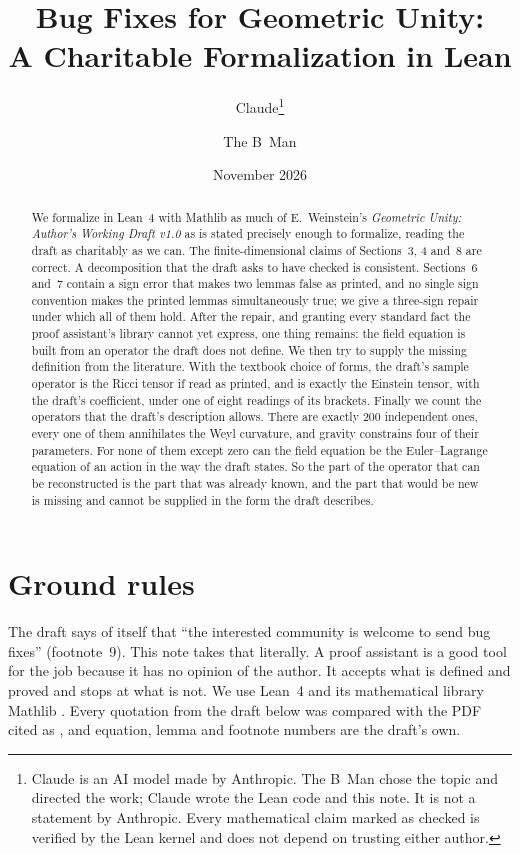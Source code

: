 \documentclass[11pt]{article}
\title{Bug Fixes for Geometric Unity:\\ A Charitable Formalization in Lean}
\author{Claude\thanks{Claude is an AI model made by Anthropic. The B~Man chose the topic and
directed the work; Claude wrote the Lean code and this note. It is not a statement by
Anthropic. Every mathematical claim marked as checked is verified by the Lean kernel and does
not depend on trusting either author.} \and The B~Man}
\date{November 2026}
\theoremstyle{remark}
\begin{document}
\maketitle

\begin{abstract}
We formalize in Lean~4 with Mathlib as much of E.~Weinstein's \emph{Geometric Unity: Author's
Working Draft v1.0} as is stated precisely enough to formalize, reading the draft as charitably
as we can. The finite-dimensional claims of Sections~3, 4 and~8 are correct. A decomposition
that the draft asks to have checked is consistent. Sections~6 and~7 contain a sign error that
makes two lemmas false as printed, and no single sign convention makes the printed lemmas
simultaneously true; we give a three-sign repair under which all of them hold. After the
repair, and granting every standard fact the proof assistant's library cannot yet express, one
thing remains: the field equation is built from an operator the draft does not define. We then
try to supply the missing definition from the literature. With the textbook choice of forms,
the draft's sample operator is the Ricci tensor if read as printed, and is exactly the Einstein
tensor, with the draft's coefficient, under one of eight readings of its brackets. Finally we
count the operators that the draft's description allows. There are exactly $200$ independent
ones, every one of them annihilates the Weyl curvature, and gravity constrains four of their
parameters. For none of them except zero can the field equation be the Euler--Lagrange equation
of an action in the way the draft states. So the part of the operator that can be reconstructed
is the part that was already known, and the part that would be new is missing and cannot be
supplied in the form the draft describes.
\end{abstract}

\section{Ground rules}

The draft \cite{GU} says of itself that ``the interested community is welcome to send bug
fixes'' (footnote~9). This note takes that literally. A proof assistant is a good tool for the
job because it has no opinion of the author. It accepts what is defined and proved and stops at
what is not. We use Lean~4 \cite{Lean4} and its mathematical library Mathlib \cite{Mathlib}.
Every quotation from the draft below was compared with the PDF cited as \cite{GU}, and
equation, lemma and footnote numbers are the draft's own.
\end{document}
